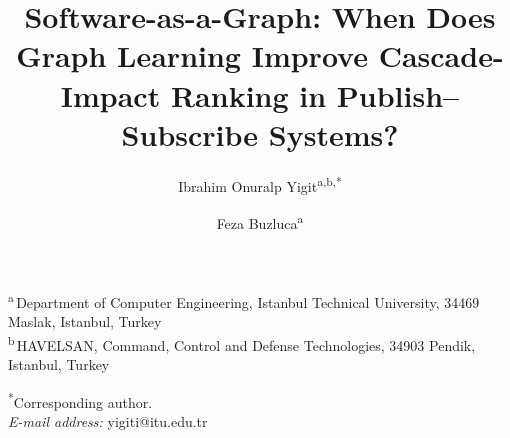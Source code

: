 %

\title{Software-as-a-Graph: When Does Graph Learning Improve
  Cascade-Impact Ranking in Publish--Subscribe Systems?}


\author{Ibrahim Onuralp Yigit\textsuperscript{a,b,*}}
\author{Feza Buzluca\textsuperscript{a}}

\bigskip
\noindent\textsuperscript{a}\,Department of Computer Engineering, Istanbul Technical University, 34469 Maslak, Istanbul, Turkey\\[0.2em]
\textsuperscript{b}\,HAVELSAN, Command, Control and Defense Technologies, 34903 Pendik, Istanbul, Turkey

\bigskip
\noindent\textsuperscript{*}Corresponding author.\\
\textit{E-mail address:} yigiti@itu.edu.tr

